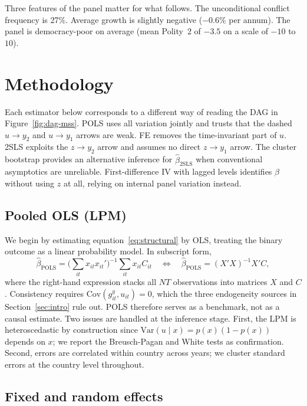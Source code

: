 \documentclass[11pt,a4paper]{article}
\begin{document}
Three features of the panel matter for what follows. The unconditional
conflict frequency is 27\%. Average growth is slightly negative
($-0.6\%$ per annum). The panel is democracy-poor on average (mean
Polity~2 of $-3.5$ on a scale of $-10$ to $10$).

\section{Methodology}\label{sec:methods}
Each estimator below corresponds to a different way of reading the DAG
in Figure~\ref{fig:dag-mss}. POLS uses all variation jointly and
trusts that the dashed $u \to y_2$ and $u \to y_1$ arrows are weak.
FE removes the time-invariant part of $u$. 2SLS exploits the $z \to
y_2$ arrow and assumes no direct $z \to y_1$ arrow. The cluster
bootstrap provides an alternative inference for $\hat\beta_{\text{2SLS}}$
when conventional asymptotics are unreliable. First-difference IV with
lagged levels identifies $\beta$ without using $z$ at all, relying on
internal panel variation instead.

\subsection{Pooled OLS (LPM)}\label{sec:pols}

We begin by estimating equation~\eqref{eq:structural} by OLS, treating
the binary outcome as a linear probability model. In subscript form,
\[
\hat\beta_{\text{POLS}}
   = \Big( \textstyle\sum_{it} x_{it} x_{it}' \Big)^{-1}
     \textstyle\sum_{it} x_{it} C_{it}
\quad\Longleftrightarrow\quad
\hat\beta_{\text{POLS}} = (X'X)^{-1} X' C,
\]
where the right-hand expression stacks all $NT$ observations into
matrices $X$ and $C$. Consistency requires
$\mathrm{Cov}(g^{y}_{it}, u_{it}) = 0$, which the three endogeneity
sources in Section~\ref{sec:intro} rule out. POLS
therefore serves as a benchmark, not as a causal estimate. Two issues
are handled at the inference stage. First, the LPM is heteroscedastic
by construction since $\mathrm{Var}(u \mid x) = p(x)(1-p(x))$ depends
on $x$; we report the Breusch-Pagan and White tests as confirmation.
Second, errors are correlated within country across years; we cluster
standard errors at the country level throughout.

\subsection{Fixed and random effects}\label{sec:fe}
\end{document}
